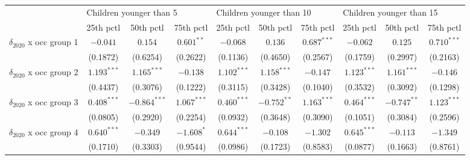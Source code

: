 \begin{tabular}{l|ccc|ccc|ccc|}
\toprule
{} & \multicolumn{3}{l}{Children younger than 5} & \multicolumn{3}{l}{Children younger than 10} & \multicolumn{3}{l}{Children younger than 15} \\
{} &               25th pctl &       50th pctl &       75th pctl &                25th pctl &       50th pctl &       75th pctl &                25th pctl &       50th pctl &       75th pctl \\
\midrule
$\delta_{2020}$ x occ group 1          &                $-0.041$ &         $0.154$ &    $0.601^{**}$ &                 $-0.068$ &         $0.136$ &   $0.687^{***}$ &                 $-0.062$ &         $0.125$ &   $0.710^{***}$ \\
                                       &                (0.1872) &        (0.6254) &        (0.2622) &                 (0.1136) &        (0.4650) &        (0.2567) &                 (0.1759) &        (0.2997) &        (0.2163) \\
$\delta_{2020}$ x occ group 2          &           $1.193^{***}$ &   $1.165^{***}$ &        $-0.138$ &            $1.102^{***}$ &   $1.158^{***}$ &        $-0.147$ &            $1.123^{***}$ &   $1.161^{***}$ &        $-0.146$ \\
                                       &                (0.4437) &        (0.3076) &        (0.1222) &                 (0.3115) &        (0.3428) &        (0.1040) &                 (0.3532) &        (0.3092) &        (0.1298) \\
$\delta_{2020}$ x occ group 3          &           $0.408^{***}$ &  $-0.864^{***}$ &   $1.067^{***}$ &            $0.460^{***}$ &   $-0.752^{**}$ &   $1.163^{***}$ &            $0.464^{***}$ &   $-0.747^{**}$ &   $1.123^{***}$ \\
                                       &                (0.0805) &        (0.2920) &        (0.2254) &                 (0.0932) &        (0.3648) &        (0.3090) &                 (0.1051) &        (0.3084) &        (0.2596) \\
$\delta_{2020}$ x occ group 4          &           $0.640^{***}$ &        $-0.349$ &      $-1.608^*$ &            $0.644^{***}$ &        $-0.108$ &        $-1.302$ &            $0.645^{***}$ &        $-0.113$ &        $-1.349$ \\
                                       &                (0.1710) &        (0.3303) &        (0.9544) &                 (0.0986) &        (0.1723) &        (0.8583) &                 (0.0877) &        (0.1663) &        (0.8761) \\

\end{tabular}
